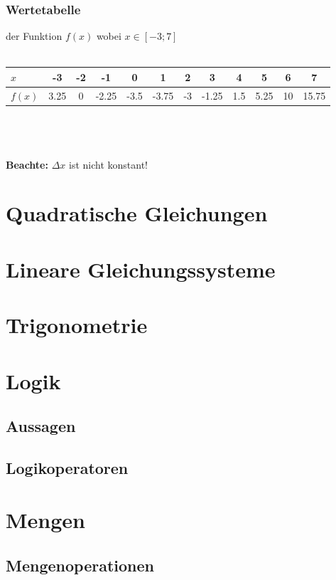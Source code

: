 \documentclass[12pt,a4paper]{scrbook}
\begin{document}
\subsection{Wertetabelle} der Funktion $f(x)$ wobei $x \in [-3; 7]$\\\\
\begin{tabular}{l||c|c|c|c|c|c|c|c|c|c|c}
$x$ & -3 & -2 & -1 & 0 & 1 & 2 & 3 & 4 & 5 & 6 & 7\\
\hline
$f(x)$ & 3.25 & 0 & -2.25 & -3.5 & -3.75 & -3 & -1.25 & 1.5 & 5.25 & 10 & 15.75\\
\end{tabular}\\\\\\
\textbf{Beachte:} $\Delta x$ ist nicht konstant!\\


\chapter{Quadratische Gleichungen}
\label{quadratische_gleichungen}


\chapter{Lineare Gleichungssysteme}

\chapter{Trigonometrie}

\chapter{Logik}
\section{Aussagen}
\section{Logikoperatoren}

\chapter{Mengen}
\section{Mengenoperationen}
\end{document}
